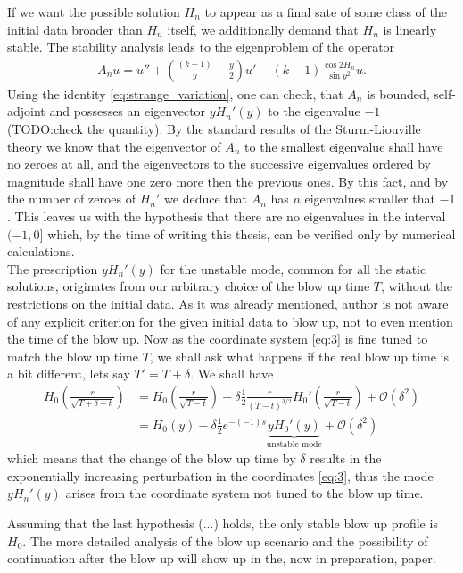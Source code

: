 If we want the possible solution $H_n$ to appear as a final sate of
some class of the initial data broader than $H_n$ itself, we
additionally demand that $H_n$ is linearly stable. The stability
analysis leads to the eigenproblem of the operator
\begin{align}
  \label{eq:8}
  A_n u=u''+\left(\frac{(k-1)}{y}-\frac{y}{2}\right)u'-(k-1)\frac{\cos2H_n}{\sin
    y^2}u.
\end{align}
Using the identity \eqref{eq:strange_variation}, one can check, that
$A_n$ is bounded, self-adjoint and possesses an eigenvector $yH_n'(y)$
to the eigenvalue $-1$ (TODO:check the quantity). By the standard
results of the Sturm-Liouville theory we know that the eigenvector of
$A_n$ to the smallest eigenvalue shall have no zeroes at all, and the
eigenvectors to the successive eigenvalues ordered by magnitude shall
have one zero more then the previous ones. By this fact, and by the
number of zeroes of $H_n'$ we deduce that $A_n$ has $n$ eigenvalues
smaller that $-1$. This leaves us with the hypothesis that there are
no eigenvalues in the interval $(-1,0]$ which, by the time of writing
this thesis, can be verified only by numerical calculations.\\
The prescription $yH_n'(y)$ for the unstable mode, common for all the
static solutions, originates from our arbitrary choice of the blow up
time $T$, without the restrictions on the initial data. As it was
already mentioned, author is not aware of any explicit criterion for
the given initial data to blow up, not to even mention the time of the
blow up. Now as the coordinate system \eqref{eq:3} is fine tuned to
match the blow up time $T$, we shall ask what happens if the real blow
up time is a bit different, lets say $T'=T+\delta$. We shall have
\begin{align}
  \label{eq:9}
  H_0\left(\frac{r}{\sqrt{T+\delta-t}}\right)
  &=H_0\left(\frac{r}{\sqrt{T-t}}\right)-\delta\frac{1}{2}\frac{r}{(T-t)^{3/2}}H_0'\left(\frac{r}{\sqrt{T-t}}\right)+\mathcal{O}(\delta^2)\\
  &=H_0(y)-\delta\frac{1}{2} e^{-(-1)s} \underbrace{yH_0'(y)}_{\text{unstable
    mode}}+\mathcal{O}(\delta^2)
\end{align}
which means that the change of the blow up time by $\delta$ results in
the exponentially increasing perturbation in the coordinates
\eqref{eq:3}, thus the mode $yH_n'(y)$ arises from the coordinate
system not tuned to the blow up time.

Assuming that the last hypothesis (...) holds, the only stable blow up
profile is $H_0$. The more detailed analysis of the blow up scenario
and the possibility of continuation after the blow up will show up in
the, now in preparation, paper.


